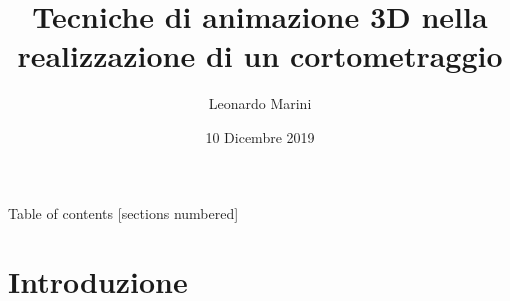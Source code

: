 \documentclass[10pt]{beamer}
\title{Tecniche di animazione 3D nella realizzazione di un cortometraggio}
\subtitle{}
\date{10 Dicembre 2019}
\author{Leonardo Marini}
\institute{ALMA MATER STUDIORUM - UNIVERSITÀ DI BOLOGNA}
\begin{document}
\maketitle

\begin{frame}{Table of contents}
  [sections numbered]
  \tableofcontents%
\end{frame}

\section[Intro]{Introduzione}
\end{document}
